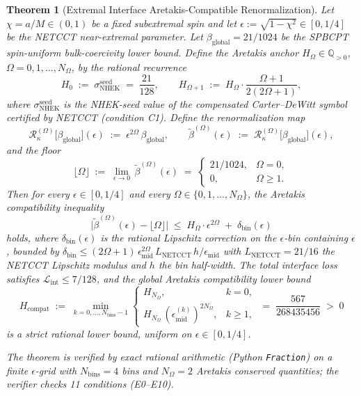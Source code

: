 \documentclass[12pt,a4paper]{article}
\newtheorem{theorem}{Theorem}[section]
\begin{document}
\begin{theorem}[Extremal Interface Aretakis-Compatible Renormalization]\label{thm:eiacrt}
Let $\chi = a/M \in (0,1)$ be a fixed subextremal spin and let
$\epsilon := \sqrt{1-\chi^2} \in [0, 1/4]$ be the NETCCT near-extremal
parameter.  Let $\beta_{\mathrm{global}} = 21/1024$ be the SPBCPT
spin-uniform bulk-coercivity lower bound.  Define the \emph{Aretakis
anchor} $H_\Omega \in \mathbb{Q}_{>0}$, $\Omega = 0, 1, \ldots, N_\Omega$,
by the rational recurrence
$$
  H_0 \;:=\; \sigma^{\mathrm{seed}}_{\mathrm{NHEK}} \;=\; \frac{21}{128},
  \qquad
  H_{\Omega+1} \;:=\; H_\Omega \cdot \frac{\Omega+1}{2(2\Omega+1)},
$$
where $\sigma^{\mathrm{seed}}_{\mathrm{NHEK}}$ is the NHEK-seed value of
the compensated Carter--DeWitt symbol certified by NETCCT (condition C1).
Define the \emph{renormalization map}
$$
  \mathcal R_\kappa^{(\Omega)}\!\bigl[\beta_{\mathrm{global}}\bigr](\epsilon)
  \;:=\; \epsilon^{2\Omega}\,\beta_{\mathrm{global}},
  \qquad
  \widetilde\beta^{(\Omega)}(\epsilon)
  \;:=\; \mathcal R_\kappa^{(\Omega)}\!\bigl[\beta_{\mathrm{global}}\bigr](\epsilon),
$$
and the \emph{floor}
$$
  \lfloor\Omega\rfloor \;:=\; \lim_{\epsilon \to 0}\,
  \widetilde\beta^{(\Omega)}(\epsilon)
  \;=\; \begin{cases} 21/1024, & \Omega = 0,\\ 0, & \Omega \geq 1. \end{cases}
$$
Then for every $\epsilon \in [0, 1/4]$ and every
$\Omega \in \{0, 1, \ldots, N_\Omega\}$, the \emph{Aretakis
compatibility inequality}
$$
  \bigl|\widetilde\beta^{(\Omega)}(\epsilon) - \lfloor\Omega\rfloor\bigr|
  \;\leq\; H_\Omega \cdot \epsilon^{2\Omega}
  \;+\; \delta_{\mathrm{bin}}(\epsilon)
$$
holds, where $\delta_{\mathrm{bin}}(\epsilon)$ is the rational
Lipschitz correction on the $\epsilon$-bin containing $\epsilon$,
bounded by
$\delta_{\mathrm{bin}} \leq (2\Omega+1)\,\epsilon_{\mathrm{mid}}^{2\Omega}\,
L_{\mathrm{NETCCT}}\,h/\epsilon_{\mathrm{mid}}$
with $L_{\mathrm{NETCCT}} = 21/16$ the NETCCT Lipschitz modulus and $h$
the bin half-width.  The total interface loss satisfies
$\mathcal L_{\mathrm{int}} \leq 7/128$, and the \emph{global Aretakis
compatibility lower bound}
$$
  H_{\mathrm{compat}}
  \;:=\; \min_{k=0,\ldots,N_{\mathrm{bins}}-1}
  \begin{cases}
    H_{N_\Omega}, & k = 0,\\
    H_{N_\Omega}\,(\epsilon_{\mathrm{mid}}^{(k)})^{2N_\Omega}, & k \geq 1,
  \end{cases}
  \;=\; \frac{567}{268435456} \;>\; 0
$$
is a strict rational lower bound, uniform on $\epsilon \in [0, 1/4]$.

The theorem is verified by exact rational arithmetic (Python
\texttt{Fraction}) on a finite $\epsilon$-grid with
$N_{\mathrm{bins}} = 4$ bins and $N_\Omega = 2$ Aretakis conserved
quantities; the verifier checks 11 conditions (E0--E10).
\end{theorem}
\end{document}
